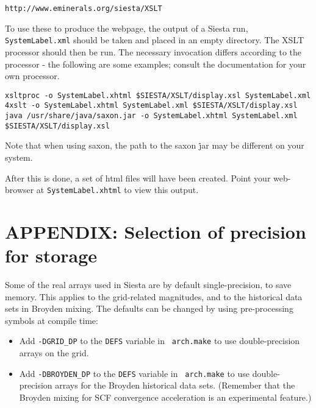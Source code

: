 \documentclass[11pt]{article}
\begin{document}
{\tt http://www.eminerals.org/siesta/XSLT}

To use these to produce the webpage, the
output of a {\sc Siesta} run, \texttt{SystemLabel.xml} should be taken and
placed in an empty directory. The XSLT processor should then be
run. The necessary invocation differs according to the processor - the
following are some examples; consult the documentation for your own
processor.

\texttt{xsltproc -o SystemLabel.xhtml \$SIESTA/XSLT/display.xsl
SystemLabel.xml}\\ \texttt{4xslt -o SystemLabel.xhtml SystemLabel.xml
\$SIESTA/XSLT/display.xsl}\\ \texttt{java /usr/share/java/saxon.jar -o
SystemLabel.xhtml SystemLabel.xml \$SIESTA/XSLT/display.xsl}

Note that when using saxon, the path to the saxon \.jar may be
different on your system.

After this is done, a set of html files will have been created. Point
your web-browser at \texttt{SystemLabel.xhtml} to view this output.

\newpage
\section{APPENDIX: Selection of precision for storage}

Some of the real arrays used in Siesta are by default
single-precision, to save memory. This applies to the grid-related
magnitudes, and to the historical data sets in Broyden mixing. The
defaults can be changed by using pre-processing symbols at compile
time:

\begin{itemize}
\item Add {\tt -DGRID\_DP} to the {\tt DEFS} variable in {\tt
  arch.make} to use double-precision arrays on the grid.
\item Add {\tt -DBROYDEN\_DP} to the {\tt DEFS} variable in {\tt
  arch.make} to use double-precision arrays for the Broyden historical
  data sets. (Remember that the Broyden mixing for SCF convergence
  acceleration is an experimental feature.) 
\end{itemize}

\printindex
\end{document}
